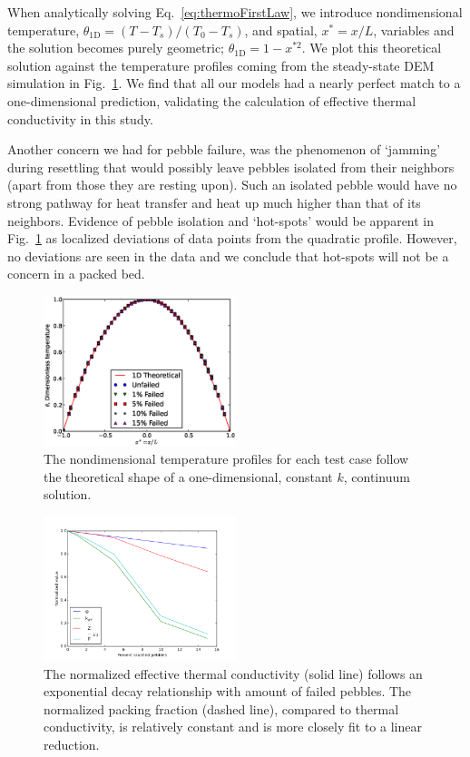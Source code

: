 When analytically solving Eq.~\ref{eq:thermoFirstLaw}, we introduce nondimensional temperature, $\theta_\text{1D} = (T -T_s)/(T_0-T_s)$, and spatial, $x^* = x/L$, variables and the solution becomes purely geometric; $\theta_\text{1D} = 1-x^{*2}$. We plot this theoretical solution against the temperature profiles coming from the steady-state DEM simulation in Fig.~\ref{fig:tempProfile}. We find that all our models had a nearly perfect match to a one-dimensional prediction, validating the calculation of effective thermal conductivity in this study. 

Another concern we had for pebble failure, was the phenomenon of `jamming' during resettling that would possibly leave pebbles isolated from their neighbors (apart from those they are resting upon). Such an isolated pebble would have no strong pathway for heat transfer and heat up much higher than that of its neighbors. Evidence of pebble isolation and `hot-spots' would be apparent in Fig.~\ref{fig:tempProfile} as localized deviations of data points from the quadratic profile. However, no deviations are seen in the data and we conclude that hot-spots will not be a concern in a packed bed.

\begin{figure}[t]
	\centering
	\includegraphics[width=0.5\textwidth]{chapters/figures/tempProfiles}
	\caption{The nondimensional temperature profiles for each test case follow the theoretical shape of a one-dimensional, constant $k$, continuum solution.}
\label{fig:tempProfile}
\end{figure}



\begin{figure}[t]
	\centering
	\includegraphics[width=0.5\textwidth]{chapters/figures/kEff_packingFraction}
	\caption{The normalized effective thermal conductivity (solid line) follows an exponential decay relationship with amount of failed pebbles. The normalized packing fraction (dashed line), compared to thermal conductivity, is relatively constant and is more closely fit to a linear reduction.}
\label{fig:packingFraction}
\end{figure}

